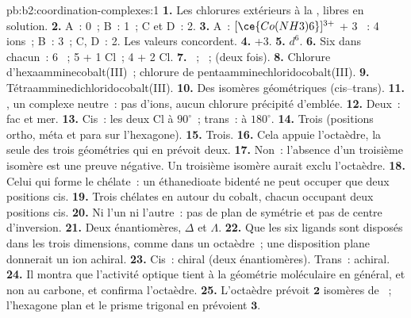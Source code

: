 \begin{solution}{pb:b2:coordination-complexes:1}
\textbf{1.} Les chlorures extérieurs à la , libres en solution.
\textbf{2.} A~: 0~; B~: 1~; C et D~: 2.
\textbf{3.} A~: $[\ce{Co(NH3)6}]^{3+}$ + 3 ~: 4 ions~; B~: 3~; C, D~: 2. Les valeurs concordent.
\textbf{4.} +3.
\textbf{5.} $d^6$.
\textbf{6.} Six dans chacun~: 6 ~; 5  + 1 Cl~; 4  + 2 Cl.
\textbf{7.} ~; ~;  (deux fois).
\textbf{8.} Chlorure d'hexaamminecobalt(III)~; chlorure de pentaamminechloridocobalt(III).
\textbf{9.} Tétraamminedichloridocobalt(III).
\textbf{10.} Des isomères géométriques (cis--trans).
\textbf{11.} \ce{[CoCl3(NH3)3]}, un complexe neutre~: pas d'ions, aucun chlorure précipité
d'emblée.
\textbf{12.} Deux~: fac et mer.
\textbf{13.} Cis~: les deux Cl à $90^\circ$~; trans~: à $180^\circ$.
\textbf{14.} Trois (positions ortho, méta et para sur l'hexagone).
\textbf{15.} Trois.
\textbf{16.} Cela appuie l'octaèdre, la seule des trois géométries qui en prévoit deux.
\textbf{17.} Non~: l'absence d'un troisième isomère est une preuve négative. Un troisième isomère aurait
exclu l'octaèdre.
\textbf{18.} Celui qui forme le chélate~: un éthanedioate bidenté ne peut occuper que deux
positions cis.
\textbf{19.} Trois chélates en autour du cobalt, chacun occupant deux positions cis.
\textbf{20.} Ni l'un ni l'autre~: pas de plan de symétrie et pas de centre d'inversion.
\textbf{21.} Deux énantiomères, $\Delta$ et $\Lambda$.
\textbf{22.} Que les six ligands sont disposés dans les trois dimensions, comme dans un
octaèdre~; une disposition plane donnerait un ion achiral.
\textbf{23.} Cis~: chiral (deux énantiomères). Trans~: achiral.
\textbf{24.} Il montra que l'activité optique tient à la géométrie moléculaire en général,
et non au carbone, et confirma l'octaèdre.
\textbf{25.} L'octaèdre prévoit $\boldsymbol{2}$ isomères de \ce{[CoCl2(NH3)4]+}~; l'hexagone
plan et le prisme trigonal en prévoient $\boldsymbol{3}$.
\end{solution}
